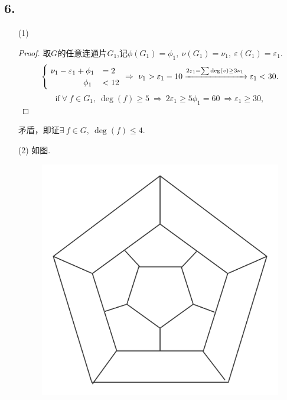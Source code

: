 \documentclass{article}
\begin{document}
\subsection*{6.}
    \begin{enumerate}
        \item [(1)]
            \begin{proof}
                取$G$的任意连通片$G_1$,记$\phi(G_1)=\phi_1,\ \nu(G_1)=\nu_1,\ \varepsilon(G_1)=\varepsilon_1$.
                \[
                    \begin{cases}
                        \ \nu_1 - \varepsilon_1 + \phi_1 &= 2\\
                        \ \qquad\qquad \phi_1 &< 12
                    \end{cases}
                    \ \Rightarrow\ 
                    \nu_1 > \varepsilon_1 -10
                    \xrightarrow{2\varepsilon_1 = \sum \deg(v) \geq 3\nu_1\\}
                    \varepsilon_1 <30.    
                \]
                \[
                    \mbox{if}\ \forall\ f\in G_1,\ \deg(f)\geq 5
                    \ \Rightarrow\ 2\varepsilon_1 \geq 5\phi_1 = 60
                    \ \Rightarrow \varepsilon_1 \geq 30,
                \]
            \end{proof}
            矛盾，即证$\exists\ f\in G,\ \deg(f)\leq 4$.
        \item [(2)]如图.
        \begin{figure}[htbp]
            \centering
            \includegraphics[scale=0.1]{t6.png}
        \end{figure}
    \end{enumerate}
\clearpage
\end{document}
